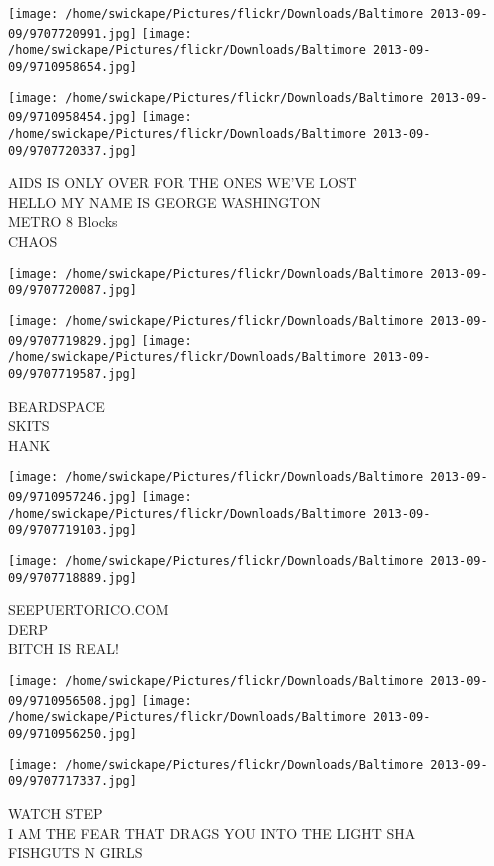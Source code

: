 \documentclass[10pt,letterpaper]{article}
\begin{document}
\texttt{[image: /home/swickape/Pictures/flickr/Downloads/Baltimore 2013-09-09/9707720991.jpg]}
\texttt{[image: /home/swickape/Pictures/flickr/Downloads/Baltimore 2013-09-09/9710958654.jpg]}

\texttt{[image: /home/swickape/Pictures/flickr/Downloads/Baltimore 2013-09-09/9710958454.jpg]}
\texttt{[image: /home/swickape/Pictures/flickr/Downloads/Baltimore 2013-09-09/9707720337.jpg]}

AIDS IS ONLY OVER FOR THE ONES WE'VE LOST\\
HELLO MY NAME IS GEORGE WASHINGTON\\
METRO 8 Blocks\\
CHAOS
\pagebreak

\texttt{[image: /home/swickape/Pictures/flickr/Downloads/Baltimore 2013-09-09/9707720087.jpg]}

\vspace{0.25in}
\texttt{[image: /home/swickape/Pictures/flickr/Downloads/Baltimore 2013-09-09/9707719829.jpg]}
\texttt{[image: /home/swickape/Pictures/flickr/Downloads/Baltimore 2013-09-09/9707719587.jpg]}

BEARDSPACE\\
SKITS\\
HANK
\pagebreak

\texttt{[image: /home/swickape/Pictures/flickr/Downloads/Baltimore 2013-09-09/9710957246.jpg]}
\texttt{[image: /home/swickape/Pictures/flickr/Downloads/Baltimore 2013-09-09/9707719103.jpg]}

\vspace{0.25in}
\texttt{[image: /home/swickape/Pictures/flickr/Downloads/Baltimore 2013-09-09/9707718889.jpg]}

SEEPUERTORICO.COM\\
DERP\\
BITCH IS REAL!
\pagebreak

\texttt{[image: /home/swickape/Pictures/flickr/Downloads/Baltimore 2013-09-09/9710956508.jpg]}
\texttt{[image: /home/swickape/Pictures/flickr/Downloads/Baltimore 2013-09-09/9710956250.jpg]}

\vspace{0.25in}
\texttt{[image: /home/swickape/Pictures/flickr/Downloads/Baltimore 2013-09-09/9707717337.jpg]}

WATCH STEP\\
I AM THE FEAR THAT DRAGS YOU INTO THE LIGHT SHA\\
FISHGUTS N GIRLS
\pagebreak
\end{document}
